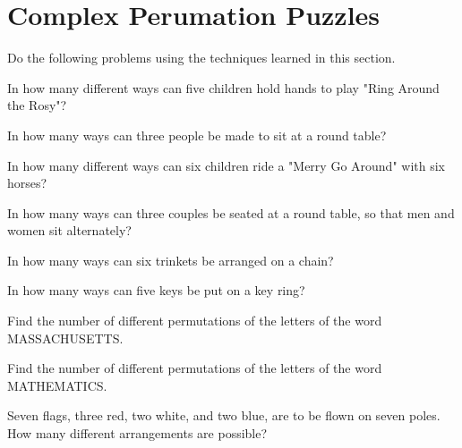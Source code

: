 \section{Complex Perumation Puzzles}

Do the following problems using the techniques learned in this section.

\begin{puzzle}
    In how many different ways can five children hold hands to play "Ring Around the Rosy"?
    \end{puzzle}
    
    \begin{puzzle}
    In how many ways can three people be made to sit at a round table?
    \end{puzzle}
    
    \begin{puzzle}
    In how many different ways can six children ride a "Merry Go Around" with six horses?
    \end{puzzle}
    
    \begin{puzzle}
        In how many ways can three couples be seated at a round table, so that men and women sit alternately?
        \end{puzzle}
        
        \begin{puzzle}
        In how many ways can six trinkets be arranged on a chain?
        \end{puzzle}
        
        \begin{puzzle}
        In how many ways can five keys be put on a key ring?
        \end{puzzle}
        
        \begin{puzzle}
        Find the number of different permutations of the letters of the word MASSACHUSETTS.
        \end{puzzle}
        
        \begin{puzzle}
        Find the number of different permutations of the letters of the word MATHEMATICS.
        \end{puzzle}
        
        \begin{puzzle}
        Seven flags, three red, two white, and two blue, are to be flown on seven poles. How many different arrangements are possible?
        \end{puzzle}
        
